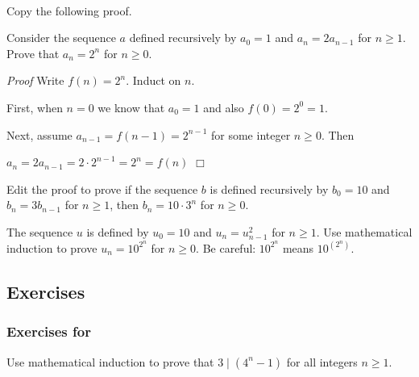 \begin{act}
\label{act_pff_math_ind_seq}
~
    \begin{actpart}
        \item Copy the following proof.
        
        Consider the sequence $a$  defined recursively by $a_0= 1$ and $a_n = 2a_{n-1}$ for $ n \ge 1$.  Prove that $a_n=2^n$ for $n \ge 0$.
        
            \emph{Proof}  Write $f(n) = 2^n$. Induct on $n$.  
                
            First, when $n=0$ we know that $a_0 = 1$ and also $f(0) = 2^0 = 1$.  
                
            Next, assume $a_{n-1} = f(n-1)= 2^{n-1}$ for some integer $n \ge 0$.  Then 
                
            \hfill $a_n = 2a_{n-1} = 2 \cdot 2^{n-1} = 2^n = f(n)$ \hfill $\Box$
           
        \item Edit the proof to prove if the sequence $b$ is defined recursively by $b_0=10$ and $b_n = 3b_{n-1}$ for $n \ge 1$, then $b_n=10\cdot3^n$ for $n \ge 0$.
        \item The sequence $u$ is defined by $u_0= 10$ and $u_n = u_{n-1}^2$ for $n \ge 1$. Use mathematical induction to prove $u_n = 10^{2^n}$ for $n \ge 0$.  Be careful: $10^{2^n}$ means $10^{(2^n)}$.
    \end{actpart}
\end{act}


\subsection{Exercises}


\subsubsection*{Exercises for 
 \subpffmathind}

\begin{exer}[\exerP] %
\label{exer_divisibility_proof_induction}
    Use mathematical induction to prove that $3 \mid (4^n-1)$ for all integers $n \ge 1$.  
\end{exer}

